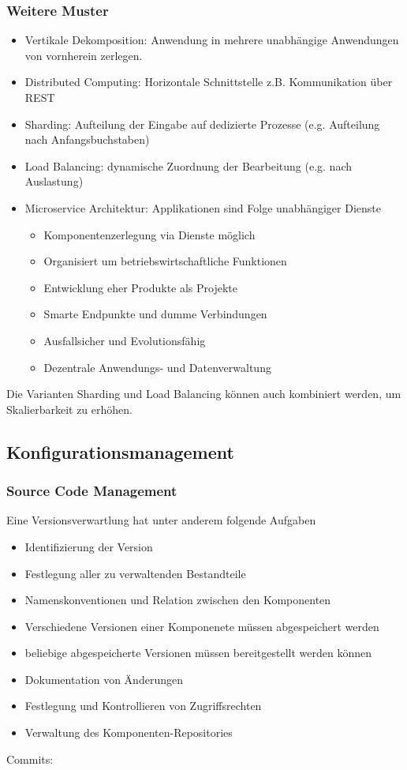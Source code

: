 \subsubsection{Weitere Muster}

\begin{itemize}
    \item Vertikale Dekomposition: Anwendung in mehrere unabhängige Anwendungen von vornherein zerlegen.
    \item Distributed Computing: Horizontale Schnittstelle z.B. Kommunikation über REST
    \item Sharding: Aufteilung der Eingabe auf dedizierte Prozesse (e.g. Aufteilung nach Anfangsbuchstaben)
    \item Load Balancing: dynamische Zuordnung der Bearbeitung (e.g. nach Auslastung)
    \item Microservice Architektur: Applikationen sind Folge unabhängiger Dienste
            \begin{itemize}
                \item Komponentenzerlegung via Dienste möglich
                \item Organisiert um betriebswirtschaftliche Funktionen
                \item Entwicklung eher Produkte als Projekte
                \item Smarte Endpunkte und dumme Verbindungen
                \item Ausfallsicher und Evolutionsfähig
                \item Dezentrale Anwendungs- und Datenverwaltung
            \end{itemize}
\end{itemize}
Die Varianten Sharding und Load Balancing können auch kombiniert werden, um Skalierbarkeit zu erhöhen.

\subsection{Konfigurationsmanagement}

\subsubsection{Source Code Management}

Eine Versionsverwartlung hat unter anderem folgende Aufgaben
\begin{itemize}
    \item Identifizierung der Version
    \item Festlegung aller zu verwaltenden Bestandteile
    \item Namenskonventionen und Relation zwischen den Komponenten
    \item Verschiedene Versionen einer Komponenete müssen abgespeichert werden
    \item beliebige abgespeicherte Versionen müssen bereitgestellt werden können
    \item Dokumentation von Änderungen
    \item Festlegung und Kontrollieren von Zugriffsrechten
    \item Verwaltung des Komponenten-Repositories
\end{itemize}
Commits:

